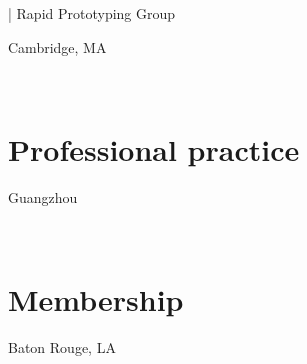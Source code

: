 \documentclass[]{baharmon_cv}
\renewcommand{\baselinestretch}{1.15}
\begin{document}
\begin{minipage}[t]{0.85\textwidth} 
\renewcommand{\baselinestretch}{1.75}
  | Rapid Prototyping Group
\end{minipage}
\begin{minipage}[t]{0.15\textwidth} 
Cambridge, MA
\end{minipage}\\

\sectiondivider


\section{Professional practice}
\begin{minipage}[t]{0.85\textwidth} 
\end{minipage}
\begin{minipage}[t]{0.15\textwidth} 
Guangzhou%
\end{minipage}\\
\clearpage



\section{Membership}
\begin{minipage}[t]{0.80\textwidth} 
\end{minipage}
\begin{minipage}[t]{0.20\textwidth} 
 Baton Rouge, LA
\end{minipage}
\\

\end{document}
